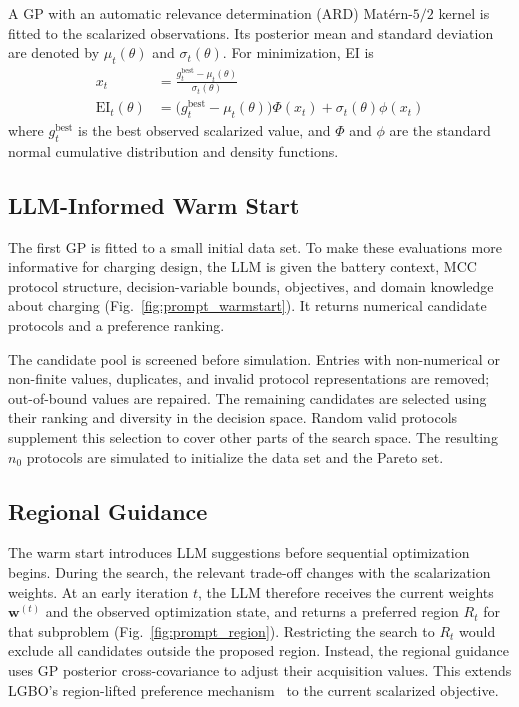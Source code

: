 \documentclass[lettersize,journal]{IEEEtran}
\begin{document}
A GP with an automatic relevance determination (ARD) Mat\'ern-$5/2$ kernel is
fitted to the scalarized observations. Its posterior mean and standard
deviation are denoted by $\mu_t(\theta)$ and $\sigma_t(\theta)$. For
minimization, EI is
\begin{align}
 x_t&=\frac{g_t^{\mathrm{best}}-\mu_t(\theta)}{\sigma_t(\theta)}\\
 \mathrm{EI}_t(\theta)
 &=\bigl(g_t^{\mathrm{best}}-\mu_t(\theta)\bigr)\Phi(x_t)
 +\sigma_t(\theta)\phi(x_t)
 \label{eq:ei}
\end{align}
where $g_t^{\mathrm{best}}$ is the best observed scalarized value, and
$\Phi$ and $\phi$ are the standard normal cumulative distribution and density
functions.

\subsection{LLM-Informed Warm Start}
\label{sec:warm_start}

The first GP is fitted to a small initial data set. To make these evaluations
more informative for charging design, the LLM is given the battery context,
MCC protocol structure, decision-variable bounds, objectives, and domain
knowledge about charging (Fig.~\ref{fig:prompt_warmstart}). It returns
numerical candidate protocols and a preference ranking.

The candidate pool is screened before simulation. Entries with non-numerical
or non-finite values, duplicates, and invalid protocol representations are
removed; out-of-bound values are repaired. The remaining candidates are
selected using their ranking and diversity in the decision space. Random
valid protocols supplement this selection to cover other parts of the search
space. The resulting $n_0$ protocols are simulated to initialize the data
set and the Pareto set.

\subsection{Regional Guidance}
\label{sec:region_pref}

The warm start introduces LLM suggestions before sequential
optimization begins. During the search, the relevant trade-off changes with
the scalarization weights. At an early iteration $t$, the LLM therefore receives the current
weights $\mathbf w^{(t)}$ and the observed optimization state, and returns a
preferred region $R_t$ for that subproblem
(Fig.~\ref{fig:prompt_region}). Restricting the search to $R_t$
would exclude all candidates outside the proposed region. Instead, the regional
guidance uses GP posterior cross-covariance to adjust their acquisition values. This
extends LGBO's region-lifted preference mechanism~\cite{ref5} to the current
scalarized objective.
\end{document}
